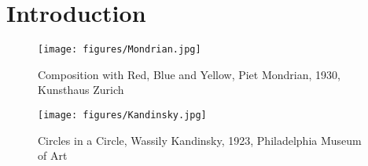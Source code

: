 \section{Introduction}


\begin{comment}
Core idea: group conditional conformal prediction. 


Structure:
\begin{enumerate}
    \item motivation: conformal prediction, uncertainty quantification, important ..., conditioning, not enough for conditional and class-conditional, concrete example (Konstantina)
    
    \item contribution: core contribution is 1) general overlapping group conditional conformal prediction (formulation); 2) reconciling statistical and computational efficiency. split conformal prediction, what we do, it is more computationally efficient; full conformal prediction, the other way; 3) implications for distribution shift; 
    (Jiayun)

    \item 3 bullet points: 1) split 2) full (comparing to previous papers) 3) distributiuon shifts 4) experiments (Jiayun)

    \item related work (Konstantina)
\end{enumerate}
\end{comment}


\begin{figure}[h!]
    \centering
    \begin{minipage}{0.45\textwidth}
        \centering
        \texttt{[image: figures/Mondrian.jpg]}
        \caption{Composition with Red, Blue and Yellow, Piet Mondrian, 1930, Kunsthaus Zurich}
        \label{fig:fig1}
    \end{minipage}%
    \hfill
    \begin{minipage}{0.45\textwidth}
        \centering
        \texttt{[image: figures/Kandinsky.jpg]}
        \caption{Circles in a Circle, Wassily Kandinsky, 1923, Philadelphia Museum of Art}
        \label{fig:fig2}
    \end{minipage}
\end{figure}

